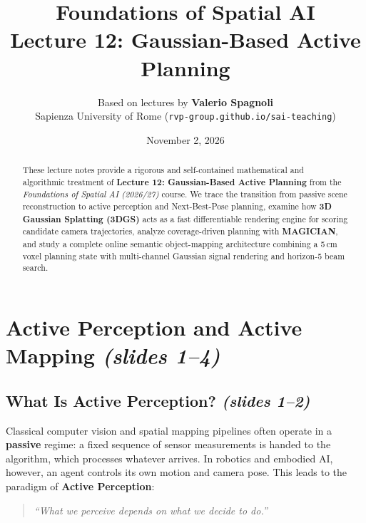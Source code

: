 \documentclass[11pt, a4paper]{article}
\title{\textbf{Foundations of Spatial AI}\\[4pt]
\Large Lecture 12: Gaussian-Based Active Planning}
\author{Based on lectures by \textbf{Valerio Spagnoli}\\
Sapienza University of Rome (\texttt{rvp-group.github.io/sai-teaching})}
\date{November 2, 2026}
\theoremstyle{definition}
\begin{document}
\maketitle

\begin{abstract}
\noindent These lecture notes provide a rigorous and self-contained mathematical and algorithmic treatment of \textbf{Lecture 12: Gaussian-Based Active Planning} from the \emph{Foundations of Spatial AI (2026/27)} course. We trace the transition from passive scene reconstruction to active perception and Next-Best-Pose planning, examine how \textbf{3D Gaussian Splatting (3DGS)} acts as a fast differentiable rendering engine for scoring candidate camera trajectories, analyze coverage-driven planning with \textbf{MAGICIAN}, and study a complete online semantic object-mapping architecture combining a 5\,cm voxel planning state with multi-channel Gaussian signal rendering and horizon-5 beam search.
\end{abstract}

\tableofcontents
\newpage

\section{Active Perception and Active Mapping \emph{(slides 1--4)}}

\subsection{What Is Active Perception? \emph{(slides 1--2)}}

Classical computer vision and spatial mapping pipelines often operate in a \textbf{passive} regime: a fixed sequence of sensor measurements is handed to the algorithm, which processes whatever arrives. In robotics and embodied AI, however, an agent controls its own motion and camera pose. This leads to the paradigm of \textbf{Active Perception}:
\begin{quote}
\emph{``What we perceive depends on what we decide to do.''}
\end{quote}
\end{document}
